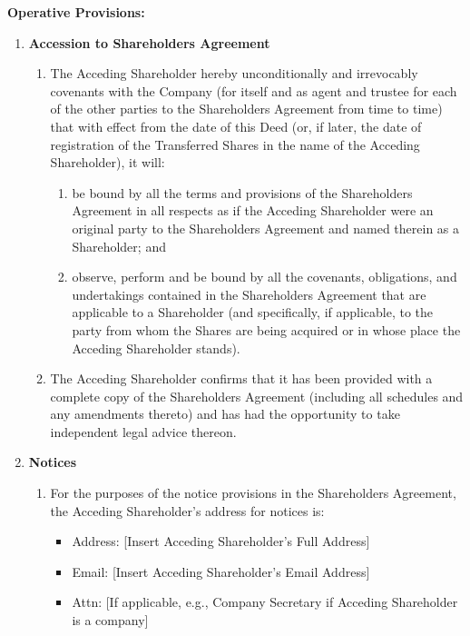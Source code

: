 \textbf{Operative Provisions:}
\begin{enumerate}
    \item \textbf{Accession to Shareholders Agreement}
    \begin{enumerate}[label=(\alph*)]
        \item The Acceding Shareholder hereby unconditionally and irrevocably covenants with the Company (for itself and as agent and trustee for each of the other parties to the Shareholders Agreement from time to time) that with effect from the date of this Deed (or, if later, the date of registration of the Transferred Shares in the name of the Acceding Shareholder), it will:
        \begin{enumerate}[label=(\roman*)]
            \item be bound by all the terms and provisions of the Shareholders Agreement in all respects as if the Acceding Shareholder were an original party to the Shareholders Agreement and named therein as a Shareholder; and
            \item observe, perform and be bound by all the covenants, obligations, and undertakings contained in the Shareholders Agreement that are applicable to a Shareholder (and specifically, if applicable, to the party from whom the Shares are being acquired or in whose place the Acceding Shareholder stands).
        \end{enumerate}
        \item The Acceding Shareholder confirms that it has been provided with a complete copy of the Shareholders Agreement (including all schedules and any amendments thereto) and has had the opportunity to take independent legal advice thereon.
    \end{enumerate}

    \item \textbf{Notices}
    \begin{enumerate}[label=(\alph*)]
        \item For the purposes of the notice provisions in the Shareholders Agreement, the Acceding Shareholder's address for notices is:
        \begin{itemize}
            \item Address: [Insert Acceding Shareholder's Full Address]
            \item Email: [Insert Acceding Shareholder's Email Address]
            \item Attn: [If applicable, e.g., Company Secretary if Acceding Shareholder is a company]
        \end{itemize}
    \end{enumerate}


\end{enumerate}
